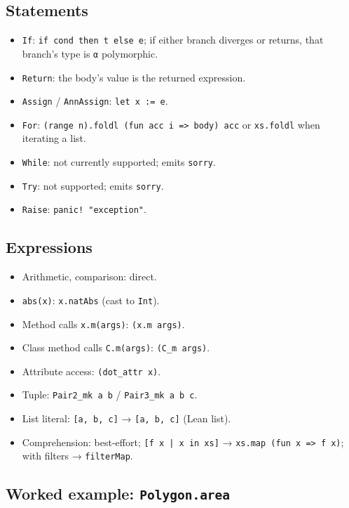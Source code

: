 \subsection{Statements}

\begin{itemize}[leftmargin=1.7em]
  \item \texttt{If}: \texttt{if cond then t else e}; if either branch
    diverges or returns, that branch's type is \texttt{α} polymorphic.
  \item \texttt{Return}: the body's value is the returned expression.
  \item \texttt{Assign} / \texttt{AnnAssign}: \texttt{let x := e}.
  \item \texttt{For}: \texttt{(range n).foldl (fun acc i => body) acc} or
    \texttt{xs.foldl} when iterating a list.
  \item \texttt{While}: not currently supported; emits \texttt{sorry}.
  \item \texttt{Try}: not supported; emits \texttt{sorry}.
  \item \texttt{Raise}: \texttt{panic! "exception"}.
\end{itemize}

\subsection{Expressions}

\begin{itemize}[leftmargin=1.7em]
  \item Arithmetic, comparison: direct.
  \item \texttt{abs(x)}: \texttt{x.natAbs} (cast to \texttt{Int}).
  \item Method calls \texttt{x.m(args)}: \texttt{(x.m args)}.
  \item Class method calls \texttt{C.m(args)}: \texttt{(C\_m args)}.
  \item Attribute access: \texttt{(dot\_attr x)}.
  \item Tuple: \texttt{Pair2\_mk a b} / \texttt{Pair3\_mk a b c}.
  \item List literal: \texttt{[a, b, c]} → \texttt{[a, b, c]} (Lean
    list).
  \item Comprehension: best-effort; \texttt{[f x | x in xs]} →
    \texttt{xs.map (fun x => f x)}; with filters → \texttt{filterMap}.
\end{itemize}

\subsection{Worked example: \texttt{Polygon.area}}

